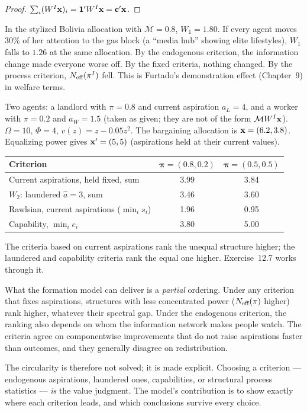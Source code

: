 \documentclass[../structural_economics_book.tex]{subfiles}
\begin{document}
\begin{proof}
$\sum_i (W^I\mathbf{x})_i = \mathbf{1}'W^I\mathbf{x} = \mathbf{c}'\mathbf{x}$.
\end{proof}

In the stylized Bolivia allocation with $\mathcal{M} = 0.8$, $W_1 = 1.80$. If every agent moves 30\% of her attention to the gas block (a ``media hub'' showing elite lifestyles), $W_1$ falls to $1.26$ at the same allocation. By the endogenous criterion, the information change made everyone worse off. By the fixed criteria, nothing changed. By the process criterion, $N_{\text{eff}}(\pi^I)$ fell. This is Furtado's demonstration effect (Chapter~9) in welfare terms.

\begin{example}\label{ch12:ex:sen_bentham}
Two agents: a landlord with $\pi = 0.8$ and current aspiration $a_L = 4$, and a worker with $\pi = 0.2$ and $a_W = 1.5$ (taken as given; they are not of the form $\mathcal{M}W^I\mathbf{x}$). $\Omega = 10$, $\Phi = 4$, $v(z) = z - 0.05z^2$. The bargaining allocation is $\mathbf{x} = (6.2, 3.8)$. Equalizing power gives $\mathbf{x}' = (5, 5)$ (aspirations held at their current values).

\begin{center}
\begin{tabular}{lcc}
\toprule
Criterion & $\boldsymbol{\pi} = (0.8, 0.2)$ & $\boldsymbol{\pi} = (0.5, 0.5)$ \\
\midrule
Current aspirations, held fixed, sum & 3.99 & 3.84 \\
$W_2$: laundered $\hat{a} = 3$, sum & 3.46 & 3.60 \\
Rawlsian, current aspirations ($\min_i s_i$) & 1.96 & 0.95 \\
Capability, $\min_i e_i$ & 3.80 & 5.00 \\
\bottomrule
\end{tabular}
\end{center}
The criteria based on current aspirations rank the unequal structure higher; the laundered and capability criteria rank the equal one higher. Exercise~12.7 works through it.
\end{example}

\begin{keyinsight}
What the formation model can deliver is a \textit{partial} ordering. Under any criterion that fixes aspirations, structures with less concentrated power ($N_{\text{eff}}(\pi)$ higher) rank higher, whatever their spectral gap. Under the endogenous criterion, the ranking also depends on whom the information network makes people watch. The criteria agree on componentwise improvements that do not raise aspirations faster than outcomes, and they generally disagree on redistribution.

The circularity is therefore not solved; it is made explicit. Choosing a criterion --- endogenous aspirations, laundered ones, capabilities, or structural process statistics --- \textit{is} the value judgment. The model's contribution is to show exactly where each criterion leads, and which conclusions survive every choice.
\end{keyinsight}
\end{document}

